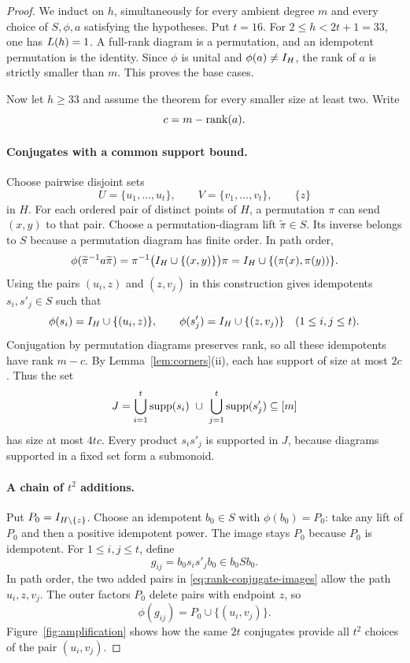 \begin{proof}
We induct on $h$, simultaneously for every ambient degree $m$ and
every choice of $S,\phi,a$ satisfying the hypotheses. Put $t=16$.
For $2\le h<2t+1=33$, one has $L(h)=1$. A full-rank diagram is
a permutation, and an idempotent permutation is the identity.
Since $\phi$ is unital and $\phi(a)\ne I_{H}$, the rank of $a$ is
strictly smaller than $m$. This proves the base cases.

Now let $h\ge33$ and assume the theorem for every smaller size at
least two. Write
\[
 c=m-\operatorname{rank}(a).
\]

\paragraph{Conjugates with a common support bound.}
Choose pairwise disjoint sets
\[
 U=\{u_1,\ldots,u_t\},\qquad
 V=\{v_1,\ldots,v_t\},\qquad \{z\}
\]
in $H$. For each ordered pair of distinct points of $H$, a
permutation $\pi$ can send $(x,y)$ to that pair. Choose a
permutation-diagram lift $\widetilde\pi\in S$. Its inverse belongs to
$S$ because a permutation diagram has finite order. In path order,
\[
 \phi(\widetilde\pi^{-1}a\widetilde\pi)
 =\pi^{-1}\bigl(I_{H}\cup\{(x,y)\}\bigr)\pi
 =I_{H}\cup\{(\pi(x),\pi(y))\}.
\]
Using the pairs $(u_i,z)$ and $(z,v_j)$ in this construction gives
idempotents $s_i,s'_j\in S$
such that
\begin{equation}\label{eq:rank-conjugate-images}
 \phi(s_i)=I_{H}\cup\{(u_i,z)\},\qquad
 \phi(s'_j)=I_{H}\cup\{(z,v_j)\}
 \quad(1\le i,j\le t).
\end{equation}
Conjugation by permutation diagrams preserves rank, so all these
idempotents have rank $m-c$. By Lemma~\ref{lem:corners}(ii), each
has support of size at most $2c$. Thus the set
\[
 J=\bigcup_{i=1}^{t}\operatorname{supp}(s_i)
       \ \cup\ \bigcup_{j=1}^{t}\operatorname{supp}(s'_j)
 \subseteq[m]
\]
has size at most $4tc$. Every product $s_i s'_j$ is supported in $J$,
because diagrams supported in a fixed set form a submonoid.

\paragraph{A chain of $t^2$ additions.}
Put $P_0=I_{H\setminus\{z\}}$. Choose an idempotent $b_0\in S$
with $\phi(b_0)=P_0$: take any lift of $P_0$ and then a positive
idempotent power. The image stays $P_0$ because $P_0$ is idempotent.
For $1\le i,j\le t$, define
\[
 g_{ij}=b_0s_i s'_j b_0\in b_0Sb_0.
\]
In path order, the two added pairs in
\eqref{eq:rank-conjugate-images} allow the path $u_i,z,v_j$.
The outer factors $P_0$ delete pairs with endpoint $z$, so
\begin{equation}\label{eq:rank-generator-image}
 \phi(g_{ij})=P_0\cup\{(u_i,v_j)\}.
\end{equation}
Figure~\ref{fig:amplification} shows how the same $2t$ conjugates provide
all $t^2$ choices of the pair $(u_i,v_j)$.


\end{proof}
